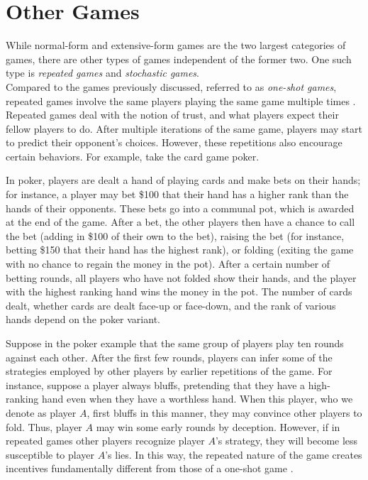 \section{Other Games}
While normal-form and extensive-form games are the two largest categories of games, there are other types of games independent of the former two. One such type is \textit{repeated games} and \textit{stochastic games}.\\

Compared to the games previously discussed, referred to as \textit{one-shot games}, repeated games involve the same players playing the same game multiple times \cite{mail06}. Repeated games deal with the notion of trust, and what players expect their fellow players to do. After multiple iterations of the same game, players may start to predict their opponent's choices. However, these repetitions also encourage certain behaviors. For example, take the card game poker.
\begin{exmp}
  In poker, players are dealt a hand of playing cards and make bets on their hands; for instance, a player may bet \$100 that their hand has a higher rank than the hands of their opponents. These bets go into a communal pot, which is awarded at the end of the game. After a bet, the other players then have a chance to call the bet (adding in \$100 of their own to the bet), raising the bet (for instance, betting \$150 that their hand has the highest rank), or folding (exiting the game with no chance to regain the money in the pot). After a certain number of betting rounds, all players who have not folded show their hands, and the player with the highest ranking hand wins the money in the pot. The number of cards dealt, whether cards are dealt face-up or face-down, and the rank of various hands depend on the poker variant.
\end{exmp}

Suppose in the poker example that the same group of players play ten rounds against each other. After the first few rounds, players can infer some of the strategies employed by other players by earlier repetitions of the game. For instance, suppose a player always bluffs, pretending that they have a high-ranking hand even when they have a worthless hand. When this player, who we denote as player $A$, first bluffs in this manner, they may convince other players to fold. Thus, player $A$ may win some early rounds by deception. However, if in repeated games other players recognize player $A$'s strategy, they will become less susceptible to player $A$'s lies. In this way, the repeated nature of the game creates incentives fundamentally different from those of a one-shot game \cite{mail06}.\\

